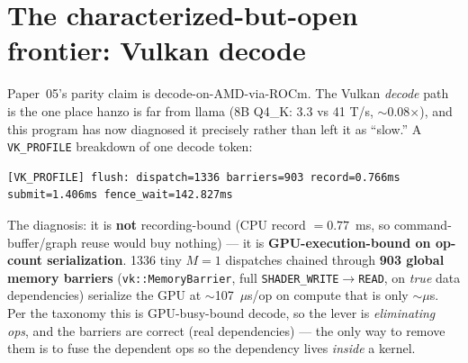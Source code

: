 \documentclass[11pt]{article}
\newcommand{\x}{\ensuremath{\times}}
\begin{document}
\section{The characterized-but-open frontier: Vulkan decode}
\label{sec:frontier}
Paper~05's parity claim is decode-on-AMD-via-ROCm. The Vulkan \emph{decode} path is the one place
hanzo is far from llama (8B Q4\_K: 3.3 vs 41 T/s, $\sim$0.08\x), and this program has now diagnosed
it precisely rather than left it as ``slow.'' A \texttt{VK\_PROFILE} breakdown of one decode token:
\begin{lstlisting}
[VK_PROFILE] flush: dispatch=1336 barriers=903 record=0.766ms submit=1.406ms fence_wait=142.827ms
\end{lstlisting}
The diagnosis: it is \textbf{not} recording-bound (CPU record $=0.77$~ms, so command-buffer/graph
reuse would buy nothing) --- it is \textbf{GPU-execution-bound on op-count serialization}. 1336
tiny $M{=}1$ dispatches chained through \textbf{903 global memory barriers} (\texttt{vk::MemoryBarrier},
full \texttt{SHADER\_WRITE}$\to$\texttt{READ}, on \emph{true} data dependencies) serialize the GPU at
$\sim$107~$\mu$s/op on compute that is only $\sim$$\mu$s. Per the taxonomy this is GPU-busy-bound
decode, so the lever is \emph{eliminating ops}, and the barriers are correct (real dependencies) ---
the only way to remove them is to fuse the dependent ops so the dependency lives \emph{inside} a
kernel.
\end{document}
